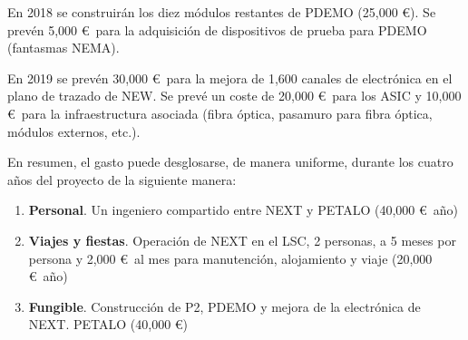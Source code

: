 En 2018 se construirán los diez módulos restantes de PDEMO (25,000 \euro). Se prevén 5,000 \euro\ para la adquisición de dispositivos de prueba para PDEMO (fantasmas NEMA). 

En 2019 se prevén 30,000 \euro\ para la mejora de 1,600 canales de electrónica en el plano de trazado de NEW. Se prevé un coste de 20,000 \euro\ para los ASIC y 10,000 \euro\ para la infraestructura asociada (fibra óptica, pasamuro para fibra óptica, módulos externos, etc.).

En resumen, el gasto puede desglosarse, de manera uniforme, durante los cuatro años del proyecto de la siguiente manera:
\begin{enumerate}
\item {\bf Personal}. Un ingeniero compartido entre NEXT y PETALO (40,000 \euro\ año)
\item {\bf Viajes y fiestas}. Operación de NEXT en el LSC, 2 personas, a 5 meses por persona y 2,000 \euro\ al mes para manutención, alojamiento y viaje (20,000 \euro\ año)
\item {\bf Fungible}. Construcción de P2, PDEMO y mejora de la electrónica de NEXT.
PETALO (40,000 \euro)

\end{enumerate}
